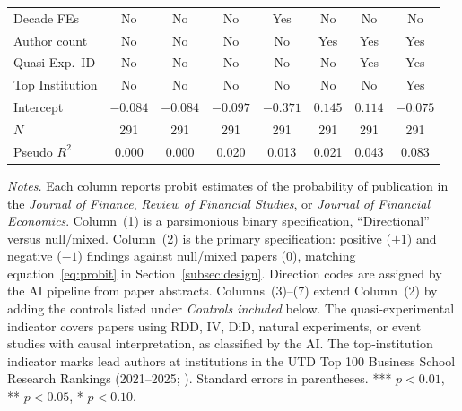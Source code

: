 \documentclass[12pt]{article}
\newcommand{\JF}{\textit{Journal of Finance}}
\newcommand{\RFS}{\textit{Review of Financial Studies}}
\newcommand{\JFE}{\textit{Journal of Financial Economics}}
\begin{document}
\begin{table}[H]
\begin{singlespace}
{\begin{tabular}{lccccccc}
Decade FEs      & No            & No            & No            & Yes           & No            & No            & No            \\
Author count    & No            & No            & No            & No            & Yes           & Yes           & Yes           \\
Quasi-Exp.\ ID  & No            & No            & No            & No            & No            & Yes           & Yes           \\
Top Institution & No            & No            & No            & No            & No            & No            & Yes           \\
\midrule
Intercept       & $-0.084$      & $-0.084$      & $-0.097$      & $-0.371$      & $0.145$       & $0.114$       & $-0.075$      \\
$N$             & 291           & 291           & 291           & 291           & 291           & 291           & 291           \\
Pseudo $R^2$    & 0.000         & 0.000         & 0.020         & 0.013         & 0.021         & 0.043         & 0.083         \\
\bottomrule
\end{tabular}}
\par\smallskip
\begin{minipage}{\textwidth}
\footnotesize
\textit{Notes.} Each column reports probit estimates of the probability of
publication in the \JF{}, \RFS{}, or \JFE{}.  Column~(1) is a parsimonious
binary specification, ``Directional'' versus null/mixed.  Column~(2) is the
primary specification: positive ($+1$) and negative ($-1$) findings against
null/mixed papers ($0$), matching equation~\eqref{eq:probit} in
Section~\ref{subsec:design}.  Direction codes are assigned by the AI pipeline
from paper abstracts.  Columns~(3)--(7) extend Column~(2) by adding the
controls listed under \textit{Controls included} below.  The
quasi-experimental indicator covers papers using RDD, IV, DiD, natural
experiments, or event studies with causal interpretation, as classified by
the AI.  The top-institution indicator marks lead authors at institutions in
the UTD Top 100 Business School Research Rankings (2021--2025;
\citealt*{UTDTop100}).  Standard errors in parentheses.
*** $p < 0.01$, ** $p < 0.05$, * $p < 0.10$.
\end{minipage}
\end{singlespace}
\end{table}
\end{document}

